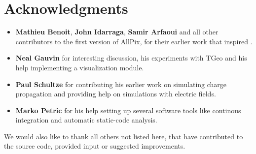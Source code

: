 \section{Acknowledgments}
\begin{itemize}
\item \textbf{Mathieu Benoit}, \textbf{John Idarraga}, \textbf{Samir Arfaoui} and all other contributors to the first version of AllPix, for their earlier work that inspired \apsq.
\item \textbf{Neal Gauvin} for interesting discussion, his experiments with TGeo and his help implementing a visualization module.
\item \textbf{Paul Schultze} for contributing his earlier work on simulating charge propagation and providing help on simulations with electric fields.
\item \textbf{Marko Petric} for his help setting up several software tools like continous integration and automatic static-code analysis.
\end{itemize}
We would also like to thank all others not listed here, that have contributed to the source code, provided input or suggested improvements. 
